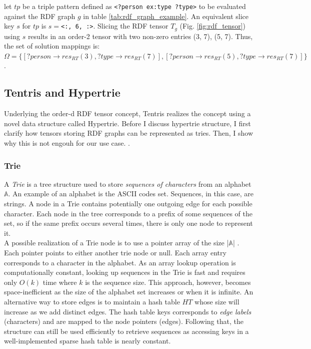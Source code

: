 \begin{example}
	let $tp$ be a triple pattern defined as \verb|<?person ex:type ?type>| to be evaluated against the RDF graph $g$ in table \ref{tab:rdf_graph_example}.  An equivalent slice key $s$ for $tp$ is $s=$\verb|<:, 6, :>|. Slicing the RDF tensor $T_{g}$ (Fig. \ref{fig:rdf_tensor}) using $s$ results in an order-2 tensor with two non-zero entries (3, 7), (5, 7). Thus, the set of solution mappings is:\\ $\Omega = \{[?person \to res_{RT}(3), ?type \to res_{RT}(7)], [?person \to res_{RT}(5), ?type \to res_{RT}(7)]\}$.
\end{example}

\clearpage

\subsection{Tentris and Hypertrie}
\label{sec:hypertrie}
Underlying the order-d RDF tensor concept, Tentris realizes the concept using a novel data structure called Hypertrie. Before I discuss hypertrie structure, I first clarify how tensors storing RDF graphs can be represented as tries. Then, I show why this is not engouh for our use case. .

\subsubsection{Trie}
\label{sec:trie}
A \textit{Trie} \cite{Brass:2008:ADS:1434862} is a tree structure used to store \textit{sequences of characters} from an alphabet $\mathbb{A}$. An example of an alphabet is the ASCII codes set. Sequences, in this case, are strings. A node in a Trie contains potentially one outgoing edge for each possible character. Each node in the tree corresponds to a prefix of some sequences of the set, so if the same prefix occurs several times, there is only one node to represent it.\\

A possible realization of a Trie node is to use a pointer array of the size |$\mathbb{A}$| \cite{Brass:2008:ADS:1434862}. Each pointer points to either another trie node or null. Each array entry corresponds to a character in the alphabet. As an array lookup operation is computationally constant, looking up sequences in the Trie is fast and requires only $O(k)$ time where $k$ is the sequence size. This approach, however, becomes space-inefficient as the size of the alphabet set increases or when it is infinite. An alternative way to store edges is to maintain a hash table $HT$ whose size will increase as we add distinct edges. The hash table keys corresponds to \textit{edge labels} (characters) and are mapped to the node pointers (edges). Following that, the structure can still be used efficiently to retrieve sequences as accessing keys in a well-implemented sparse hash table is nearly constant. \\ 

